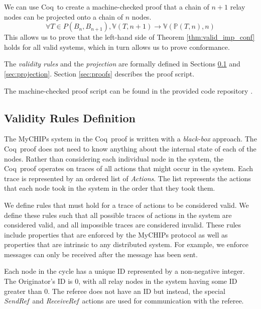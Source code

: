 \documentclass[runningheads]{llncs}
\newcommand{\sendref}{\emph{SendRef}}
\newcommand{\receiveref}{\emph{ReceiveRef}}
\newcommand{\actsvalid}[2]{\mathds{V}(#1, #2)}
\newcommand{\projectsize}[2]{\mathds{P}(#1, #2)}
\newcommand{\secref}[1]{Section \ref{#1}}
\newcommand{\coq}{Coq}
\newcommand{\coderepository}{provided code repository \cite{Storey_Extending_Model_Checking_2023}}
\newif\ifcomments
\newif\ifkylecomments
\newcommand{\egm}[1]{\ifcomments\textcolor{orange}{egm: #1}\fi}
\newcommand{\krs}[1]{\ifkylecomments\textcolor{blue}{krs: #1}\fi}
\begin{document}
We can use \coq\ to create a machine-checked proof that a chain of $n+1$ relay nodes can be projected onto a chain of $n$ nodes.
\begin{equation}
\label{eq:larger_smaller_valid}
\forall T \in P(B_n, B_{n+1}), 
\actsvalid{T}{n+1} \longrightarrow
\actsvalid{\projectsize{T}{n}}{n}
\end{equation}
This allows us to prove that the left-hand side of Theorem \ref{thm:valid_imp_conf} holds for all valid systems, which in turn allows us to prove conformance.
\krs{Just a short blurb, but does this help? \egm{The above is confusing the context of the larger proof because it is going from $n + 1$ to $n$. Need some text to help understand.}}

The \emph{validity rules} and the \emph{projection} are formally defined in Sections \ref{sec:definitions} and \ref{sec:projection}. \secref{sec:proofs} describes the proof script.

The machine-checked proof script can be found in the \coderepository.

\subsection{Validity Rules Definition} \label{sec:definitions}
The MyCHIPs system in the \coq\ proof is written with a \emph{black-box} approach. The \coq\ proof does not need to know anything about the internal state of each of the nodes. Rather than considering each individual node in the system, the \coq\ proof operates on traces of all actions that might occur in the system. Each trace is represented by an ordered list of \emph{Actions}. The list represents the actions that each node took in the system in the order that they took them.

We define rules that must hold for a trace of actions to be considered valid. We define these rules such that all possible traces of actions in the system are considered valid, and all impossible traces are considered invalid. These rules include properties that are enforced by the MyCHIPs protocol as well as properties that are intrinsic to any distributed system. For example, we enforce  messages can only be received after the message has been sent.

Each node in the cycle has a unique ID represented by a non-negative integer. The Originator's ID is 0, with all relay nodes in the system having some ID greater than 0. The referee does not have an ID but instead, the special \sendref\ and \receiveref\ actions are used for communication with the referee. 
\end{document}
